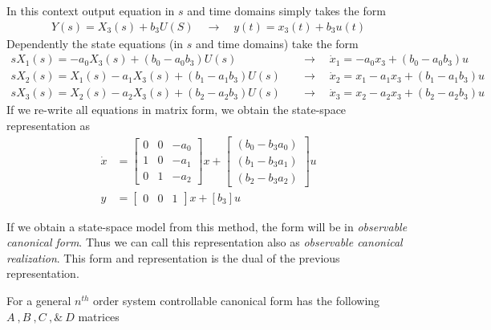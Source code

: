 \documentclass[twoside]{article}
\begin{document}
%
In this context output equation in $s$ and time domains simply takes the form
%
\begin{align*}
	Y(s) = X_3(s) + b_3 U(S) \quad \rightarrow \quad y(t) = x_3(t) + b_3 u(t)
\end{align*}
% 
Dependently the state equations (in $s$ and time domains) take the form
%
%
\begin{align*}
s X_1(s) = -a_0 X_3(s)  + ( b_0 - a_0 b_3) U(s) \quad &\rightarrow \quad \dot{x}_1 = -a_0 x_3  + ( b_0 - a_0 b_3) u
\\
s X_2(s) = X_1(s)  -a_1 X_3(s) + ( b_1 - a_1 b_3 ) U(s)  \quad &\rightarrow \quad \dot{x}_2 = x_1  - a_1 x_3 + ( b_1 - a_1 b_3 ) u
\\
s X_3(s) = X_2(s)  -a_2 X_3(s) + ( b_2 - a_2 b_3 ) U(s)  \quad &\rightarrow \quad \dot{x}_3 = x_2  - a_2 x_3 + ( b_2 - a_2 b_3 ) u
\end{align*}
%
If we re-write all equations in matrix form, we obtain the state-space representation as
%
\begin{align*}
	\dot{x} &= \left[ \begin{array}{ccc} 0 & 0 & -a_0  \\  1 & 0 & -a_1 \\  0 & 1 & -a_2 \end{array} \right] x 
	+ \left[ \begin{array}{c} ( b_0 - b_3 a_0 ) \\ ( b_1 - b_3 a_1 ) \\ ( b_2 - b_3 a_2 ) \end{array} \right] u
	\\
	y &= \left[ \begin{array}{ccc} 0 & 0  & 1 \end{array} \right] x
	+ \left[ b_3 \right] u
\end{align*}

If we obtain a state-space model from this method, the form
will be in \textit{observable canonical form}. Thus we can call this representation also as 
\textit{observable canonical realization}. This form and
representation is the dual of the previous representation. 

For a general $n^{th}$ order system controllable
canonical form has the following $A \ ,  B \ ,  C \ , \& \ D$
matrices
\end{document}

